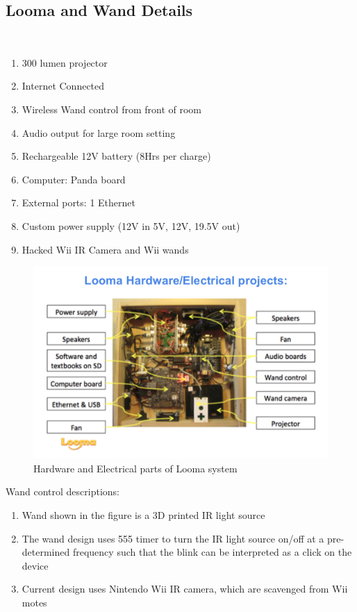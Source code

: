 \documentclass[12pt, a4paper]{article}
\begin{document}
\subsection{Looma and Wand Details}
~\\
\begin{enumerate}
\item300 lumen projector
\item Internet Connected 
\item Wireless Wand control from front of room
\item Audio output for large room setting
\item Rechargeable 12V battery (8Hrs per charge)
\item Computer: Panda board
\item External ports: 1 Ethernet
\item Custom power supply (12V in 5V, 12V, 19.5V out)
\item Hacked Wii IR Camera and Wii wands
\end{enumerate}

\begin{figure}[htp]
\centering
\includegraphics[scale=0.22]{looma}
\caption{Hardware and Electrical parts of Looma system}
\label{}
\end{figure}

\newpage

Wand control descriptions:
\begin{enumerate}
\item Wand shown in the figure is a 3D printed IR light source
\item The wand design uses 555 timer to turn the IR light source on/off at a pre-determined frequency such that the blink can be interpreted as a click on the device
\item Current design uses Nintendo Wii IR camera, which are scavenged from Wii motes
\end{enumerate}
\end{document}
